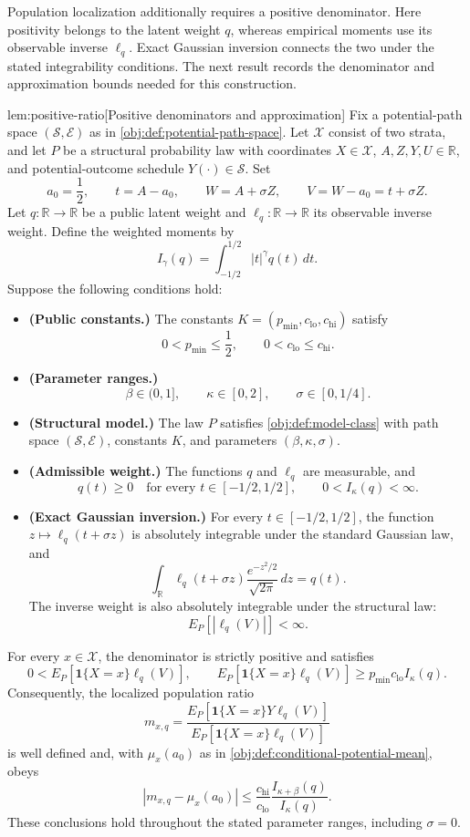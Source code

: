 \documentclass[11pt]{article}
\begin{document}
Population localization additionally requires a positive denominator. Here positivity belongs to the latent weight \(q\), whereas empirical moments use its observable inverse \(\ell_q\). Exact Gaussian inversion connects the two under the stated integrability conditions. The next result records the denominator and approximation bounds needed for this construction.

\begin{lemmav}{lem:positive-ratio}[Positive denominators and approximation]
Fix a potential-path space \((\mathcal S,\mathcal E)\) as in \cref{obj:def:potential-path-space}. Let \(\mathcal X\) consist of two strata, and let \(P\) be a structural probability law with coordinates \(X\in\mathcal X\), \(A,Z,Y,U\in\mathbb R\), and potential-outcome schedule \(Y(\cdot)\in\mathcal S\). Set
\[
a_0=\frac12,\qquad t=A-a_0,\qquad W=A+\sigma Z,\qquad V=W-a_0=t+\sigma Z.
\]
Let \(q:\mathbb R\to\mathbb R\) be a public latent weight and \(\ell_q:\mathbb R\to\mathbb R\) its observable inverse weight. Define the weighted moments by
\[
I_\gamma(q)=\int_{-1/2}^{1/2}|t|^\gamma q(t)\,dt.
\]
Suppose the following conditions hold:
\begin{itemize}
\item \textbf{(Public constants.)} The constants \(K=(p_{\min},c_{\mathrm{lo}},c_{\mathrm{hi}})\) satisfy
\[
0<p_{\min}\le\frac12,\qquad 0<c_{\mathrm{lo}}\le c_{\mathrm{hi}}.
\]
\item \textbf{(Parameter ranges.)}
\[
\beta\in(0,1],\qquad \kappa\in[0,2],\qquad \sigma\in[0,1/4].
\]
\item \textbf{(Structural model.)} The law \(P\) satisfies \cref{obj:def:model-class} with path space \((\mathcal S,\mathcal E)\), constants \(K\), and parameters \((\beta,\kappa,\sigma)\).
\item \textbf{(Admissible weight.)} The functions \(q\) and \(\ell_q\) are measurable, and
\[
q(t)\ge0\quad\text{for every }t\in[-1/2,1/2],
\qquad 0<I_\kappa(q)<\infty.
\]
\item \textbf{(Exact Gaussian inversion.)} For every \(t\in[-1/2,1/2]\), the function \(z\mapsto\ell_q(t+\sigma z)\) is absolutely integrable under the standard Gaussian law, and
\[
\int_{\mathbb R}\ell_q(t+\sigma z)\frac{e^{-z^2/2}}{\sqrt{2\pi}}\,dz=q(t).
\]
The inverse weight is also absolutely integrable under the structural law:
\[
E_P[|\ell_q(V)|]<\infty.
\]
\end{itemize}
For every \(x\in\mathcal X\), the denominator is strictly positive and satisfies
\[
0<E_P[\mathbf1\{X=x\}\ell_q(V)],
\qquad
E_P[\mathbf1\{X=x\}\ell_q(V)]
\ge p_{\min}c_{\mathrm{lo}}I_\kappa(q).
\]
Consequently, the localized population ratio
\[
m_{x,q}
=
\frac{E_P[\mathbf1\{X=x\}Y\ell_q(V)]}
     {E_P[\mathbf1\{X=x\}\ell_q(V)]}
\]
is well defined and, with \(\mu_x(a_0)\) as in \cref{obj:def:conditional-potential-mean}, obeys
\[
|m_{x,q}-\mu_x(a_0)|
\le
\frac{c_{\mathrm{hi}}}{c_{\mathrm{lo}}}
\frac{I_{\kappa+\beta}(q)}{I_\kappa(q)}.
\]
These conclusions hold throughout the stated parameter ranges, including \(\sigma=0\).
\end{lemmav}
\end{document}
